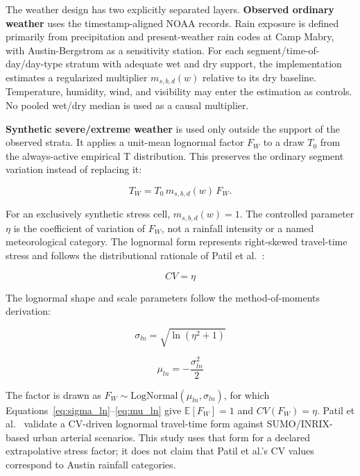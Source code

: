 The weather design has two explicitly separated layers. \textbf{Observed ordinary weather} uses the timestamp-aligned NOAA records. Rain exposure is defined primarily from precipitation and present-weather rain codes at Camp Mabry, with Austin-Bergstrom as a sensitivity station. For each segment/time-of-day/day-type stratum with adequate wet and dry support, the implementation estimates a regularized multiplier $m_{s,b,d}(w)$ relative to its dry baseline. Temperature, humidity, wind, and visibility may enter the estimation as controls. No pooled wet/dry median is used as a causal multiplier.

\textbf{Synthetic severe/extreme weather} is used only outside the support of the observed strata. It applies a unit-mean lognormal factor $F_W$ to a draw $T_0$ from the always-active empirical T distribution. This preserves the ordinary segment variation instead of replacing it:

\begin{equation}
T_W = T_0\,m_{s,b,d}(w)\,F_W.
\label{eq:weather-compose}
\end{equation}

For an exclusively synthetic stress cell, $m_{s,b,d}(w)=1$. The controlled parameter $\eta$ is the coefficient of variation of $F_W$, not a rainfall intensity or a named meteorological category. The lognormal form represents right-skewed travel-time stress and follows the distributional rationale of Patil et al.~\cite{Patil2025Conformal}:

\begin{equation} CV = \eta \label{eq:cv_eta} \end{equation}

The lognormal shape and scale parameters follow the method-of-moments derivation:

\begin{equation} \sigma_{ln} = \sqrt{\ln(\eta^2 + 1)} \label{eq:sigma_ln} \end{equation}

\begin{equation} \mu_{ln} = -\frac{\sigma_{ln}^2}{2} \label{eq:mu_ln} \end{equation}

The factor is drawn as $F_W \sim \text{LogNormal}(\mu_{ln},\sigma_{ln})$, for which Equations~\eqref{eq:sigma_ln}--\eqref{eq:mu_ln} give $\mathbb{E}[F_W]=1$ and $CV(F_W)=\eta$. Patil et al.~\cite{Patil2025Conformal} validate a CV-driven lognormal travel-time form against SUMO/INRIX-based urban arterial scenarios. This study uses that form for a declared extrapolative stress factor; it does not claim that Patil et al.'s CV values correspond to Austin rainfall categories.

